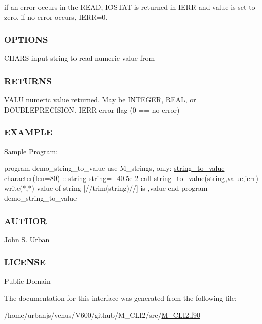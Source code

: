 if an error occurs in the R\+E\+AD, I\+O\+S\+T\+AT is returned in I\+E\+RR and value is set to zero. if no error occurs, I\+E\+RR=0. \subsubsection*{O\+P\+T\+I\+O\+NS}

C\+H\+A\+RS input string to read numeric value from \subsubsection*{R\+E\+T\+U\+R\+NS}

V\+A\+LU numeric value returned. May be I\+N\+T\+E\+G\+ER, R\+E\+AL, or D\+O\+U\+B\+L\+E\+P\+R\+E\+C\+I\+S\+I\+ON. I\+E\+RR error flag (0 == no error) \subsubsection*{E\+X\+A\+M\+P\+LE}

Sample Program\+:

program demo\+\_\+string\+\_\+to\+\_\+value use M\+\_\+strings, only\+: \mbox{\hyperlink{interfacem__cli2_1_1string__to__value}{string\+\_\+to\+\_\+value}} character(len=80) \+:\+: string string=\textquotesingle{} -\/40.\+5e-\/2 \textquotesingle{} call string\+\_\+to\+\_\+value(string,value,ierr) write($\ast$,$\ast$) \textquotesingle{}value of string \mbox{[}\textquotesingle{}//trim(string)//\textquotesingle{}\mbox{]} is \textquotesingle{},value end program demo\+\_\+string\+\_\+to\+\_\+value \subsubsection*{A\+U\+T\+H\+OR}

John S. Urban \subsubsection*{L\+I\+C\+E\+N\+SE}

Public Domain 

The documentation for this interface was generated from the following file\+:\begin{DoxyCompactItemize}
\item 
/home/urbanjs/venus/\+V600/github/\+M\+\_\+\+C\+L\+I2/src/\mbox{\hyperlink{M__CLI2_8f90}{M\+\_\+\+C\+L\+I2.\+f90}}\end{DoxyCompactItemize}
